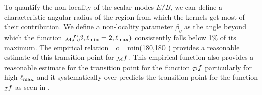 
To quantify the non-locality of the scalar modes $E/B$, we can define a characteristic angular radius of the region from which the kernels get most of their contribution.   We define a non-locality parameter $\beta_{o}$ as the angle beyond which the function ${_{\mathcal{M}}f}(\beta,\ell_{\rm min}=2,\ell_{\rm max})$ consistently falls below 1\% of its maximum.  
The empirical relation
\beq
\beta_o= {\rm min}\left(180,180  \right)
\eeq
provides a reasonable estimate of this transition point for  ${}_{\mathcal{M}}f$. This empirical function also provides a reasonable estimate for the transition point for the function ${}_{\mathcal{D}}f$ particularly for high $\ell_{\rm max}$ and it systematically over-predicts the transition point for the function ${}_{\mathcal{I}}f$ as seen in .

